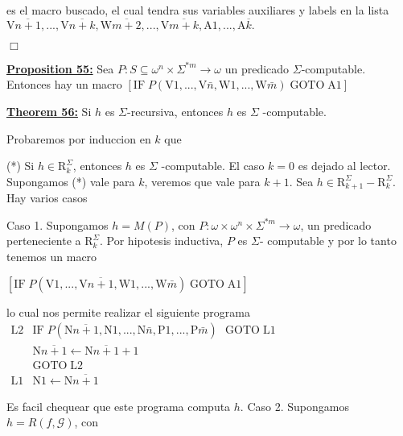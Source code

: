 es el macro buscado, el cual tendra sus variables auxiliares y labels en la lista
\(\displaystyle \mathrm{V}\overline{n+1},...,\mathrm{V}\overline{n+k},\mathrm{W}\overline{m+2 },...,\mathrm{V}\overline{m+k},\mathrm{A}1,...,\mathrm{A}\overline{k}. \)

\(\Box\)




\textbf{\underline{Proposition 55:}} Sea \(P:S\subseteq \omega ^{n}\times \Sigma ^{\ast m}\rightarrow \omega \) un predicado \(\Sigma \)-computable. Entonces hay un macro
\(\displaystyle \left[ \mathrm{IF}\;P(\mathrm{V}1,...,\mathrm{V}\bar{n},\mathrm{W}1,..., \mathrm{W}\bar{m})\;\mathrm{GOTO}\;\mathrm{A}1\right] \)



\textbf{\underline{Theorem 56:}} Si \(h\) es \(\Sigma \)-recursiva, entonces \(h\) es \(\Sigma \) -computable.

\PROOF Probaremos por induccion en \(k\) que

(*) Si \(h\in \mathrm{R}_{k}^{\Sigma }\), entonces \(h\) es \(\Sigma \) -computable.
El caso \(k=0\) es dejado al lector. Supongamos (*) vale para \(k\), veremos que vale para \(k+1\). Sea \(h\in \mathrm{R}_{k+1}^{\Sigma }-\mathrm{R} _{k}^{\Sigma }.\) Hay varios casos

Caso 1. Supongamos \(h=M(P)\), con \(P:\omega \times \omega ^{n}\times \Sigma ^{\ast m}\rightarrow \omega \), un predicado perteneciente a \(\mathrm{R} _{k}^{\Sigma }\). Por hipotesis inductiva, \(P\) es \(\Sigma \)- computable y por lo tanto tenemos un macro

\(\displaystyle \left[ \mathrm{IF}\;P(\mathrm{V}1,...,\mathrm{V}\overline{n+1},\mathrm{W} 1,...,\mathrm{W}\bar{m})\;\mathrm{GOTO}\;\mathrm{A}1\right] \)

lo cual nos permite realizar el siguiente programa
\(\displaystyle \begin{array}{ll} \mathrm{L}2 & \mathrm{IF}\;P(\mathrm{N}\overline{n+1},\mathrm{N}1,..., \mathrm{N}\bar{n},\mathrm{P}1,...,\mathrm{P}\bar{m})\text{\ }\mathrm{GOTO}\; \mathrm{L}1 \\ & \mathrm{N}\overline{n+1}\leftarrow \mathrm{N}\overline{n+1}+1 \\ & \mathrm{GOTO}\;\mathrm{L}2 \\ \mathrm{L}1 & \mathrm{N}1\leftarrow \mathrm{N}\overline{n+1} \end{array} \)

Es facil chequear que este programa computa \(h.\)
Caso 2. Supongamos \(h=R(f,\mathcal{G})\), con

